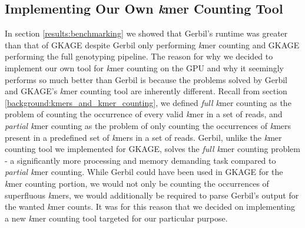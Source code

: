 \subsection{Implementing Our Own \textit{k}mer Counting Tool} \label{discussion:implementing_our_own_kmer_counting_tool}
In section \ref{results:benchmarking} we showed that Gerbil's \cite{gerbil} runtime was greater than that of GKAGE despite Gerbil only performing \textit{k}mer counting and GKAGE performing the full genotyping pipeline.
The reason for why we decided to implement our own tool for \textit{k}mer counting on the GPU and why it seemingly performs so much better than Gerbil is because the problems solved by Gerbil and GKAGE's \textit{k}mer counting tool are inherently different.
Recall from section \ref{background:kmers_and_kmer_counting}, we defined \textit{full k}mer counting as the problem of counting the occurrence of every valid \textit{k}mer in a set of reads, and \textit{partial k}mer counting as the problem of only counting the occurrences of \textit{k}mers present in a predefined set of \textit{k}mers in a set of reads.
Gerbil, unlike the \textit{k}mer counting tool we implemented for GKAGE, solves the \textit{full k}mer counting problem - a significantly more processing and memory demanding task compared to \textit{partial k}mer counting.
While Gerbil could have been used in GKAGE for the \textit{k}mer counting portion, we would not only be counting the occurrences of superfluous \textit{k}mers, we would additionally be required to parse Gerbil's output for the wanted \textit{k}mer counts.
It was for this reason that we decided on implementing a new \textit{k}mer counting tool targeted for our particular purpose.
